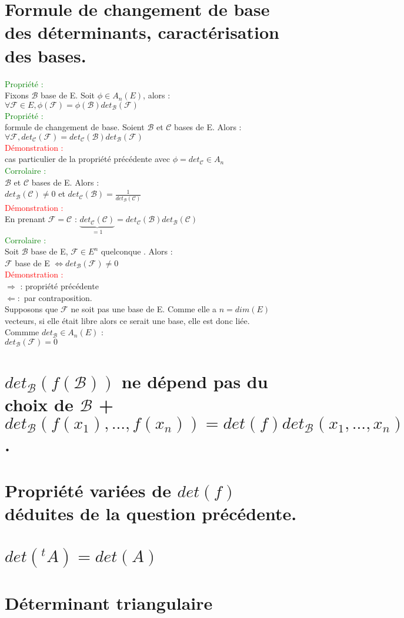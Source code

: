 \documentclass{article}
\begin{document}
	\section{Formule de changement de base des déterminants, caractérisation des bases.}
	\textcolor{green}{Propriété :} \\
	Fixons $\mathcal B$ base de E. Soit $\phi \in A_n(E)$, alors : \\
	$\forall \mathcal F \in E, \phi(\mathcal F)= \phi(\mathcal B)det_{\mathcal B}(\mathcal F)$ \\
	\textcolor{green}{Propriété :} \\
	formule de changement de base. Soient $\mathcal B$ et $\mathcal C$ bases de E. Alors : \\
	$\forall \mathcal F, det_{\mathcal C}(\mathcal F)= det_{\mathcal C}(\mathcal B) det_{\mathcal B}(\mathcal F)$ \\
	\textcolor{red}{Démonstration :} \\
	cas particulier de la propriété précédente avec $\phi= det_{\mathcal C} \in A_n$ \\
	\textcolor{green}{Corrolaire :} \\
	$\mathcal B$ et $\mathcal{C}$ bases de E. Alors : \\
	$det_{\mathcal B}(\mathcal C) \neq 0$ et $det_{\mathcal C}(\mathcal B)= \frac{1}{det_{\mathcal B}(\mathcal C)}$ \\
	\textcolor{red}{Démonstration :} \\
	En prenant $\mathcal F= \mathcal C$ : $\underbrace{det_{\mathcal C}(\mathcal C)}_{=1}=det_{\mathcal C}(\mathcal B)det_{\mathcal B}(\mathcal C)$ \\
	\textcolor{green}{Corrolaire :} \\
	Soit $\mathcal B$ base de E, $\mathcal F \in  E^n$ quelconque . Alors : \\
	$\mathcal F$ base de E $\Longleftrightarrow det_{\mathcal B}(\mathcal F) \neq 0$ \\
	\textcolor{red}{Démonstration :} \\
	$\Rightarrow$ : propriété précédente \\
	$\Leftarrow :$ par contraposition. \\
	Supposons que $\mathcal F$ ne soit pas une base de E. Comme elle a $n=dim(E)$ vecteurs, si elle était libre alors ce serait une base, elle est donc liée. \\
	Commme $det_{\mathcal B} \in A_n(E)$ : \\
	$det_{\mathcal B}(\mathcal F)=0$
	\section{$det_{\mathcal B}(f(\mathcal B))$ ne dépend pas du choix de $\mathcal B$ + $det_{\mathcal B}(f(x_1),...,f(x_n))=det(f)det_{\mathcal B}(x_1,...,x_n) $.}
	\section{Propriété variées de $det(f)$ déduites de la question précédente.}
	\section{$det({}^tA)=det(A)$}
	\section{Déterminant triangulaire}
	
\end{document}
